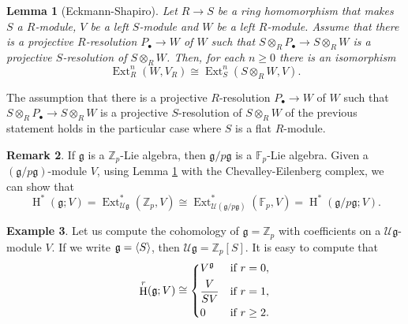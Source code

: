 \documentclass[11pt]{article}
\newcommand{\Fp}{\mathbb{F}_p}
\newcommand{\Zp}{\mathbb{Z}_p}
\newcommand{\g}{\mathfrak{g}}
\newcommand{\U}{\mathcal{U}}
\DeclareMathOperator{\HH}{H}
\DeclareMathOperator{\Ext}{Ext}
\newcommand{\isom}{\cong}
\DeclarePairedDelimiter{\gen}{\langle}{\rangle}
\theoremstyle{plain}
\newtheorem{lemma}{Lemma}[section]
\theoremstyle{definition}
\newtheorem{remark}[lemma]{Remark}
\newtheorem{example}[lemma]{Example}
\begin{document}
\begin{lemma}[Eckmann-Shapiro]\label{lem: eckmann-shapiro}
	Let $R\longrightarrow S$ be a ring homomorphism that makes $S$ a $R$-module, $V$ be a left  $S$-module and $W$ be a left $R$-module. Assume that there is a projective $R$-resolution $ P_{\bullet} \longrightarrow W$ of $W$ such that $S\otimes_RP_{\bullet}\longrightarrow S\otimes_R W$ is a projective $S$-resolution of $S\otimes_R W$. Then, for each $n\geq 0$ there is an isomorphism 
	\begin{displaymath}
		\Ext_R^n (W,V_R)\isom \Ext_S^n(S\otimes_R W, V).
	\end{displaymath}
\end{lemma}

The assumption that  there is a projective $R$-resolution $ P_{\bullet} \longrightarrow W$ of $W$ such that $S\otimes_RP_{\bullet}\longrightarrow S\otimes_R W$ is a projective $S$-resolution of $S\otimes_R W$ of the previous statement holds in the particular case where $S$ is a flat $R$-module. 


\begin{remark}
	If $\g$ is a $\Zp$-Lie algebra, then $\g/p\g$ is a $\Fp$-Lie algebra. Given a $(\g/p\g)$-module $V$, using Lemma \ref{lem: eckmann-shapiro} with the Chevalley-Eilenberg complex, we can show that 
	\begin{displaymath}
		\HH^{*}(\g;V)=\Ext_{\U\g}^{*}(\Zp,V)\isom\Ext_{\U(\g/p\g)}^{*}(\Fp,V)=\HH^{*}(\g/p\g;V).
	\end{displaymath}
\end{remark}

\begin{example}\label{ex: LieDimOne}
	Let us compute the cohomology of $\g=\Zp$ with coefficients on a $\U\g$-module $V$. If we write $\g=\gen{S}$, then $\U\g=\Zp[S]$. It is easy to compute that 
	\begin{displaymath}
		\HH^r(\g;V)\isom \begin{dcases}
			V^{\g} & \text{if } r=0, \\
			\frac{V}{SV} & \text{if } r=1, \\
			0 & \text{if } r\geq 2. \\
		\end{dcases}
	\end{displaymath}
\end{example}


	
	

	
	
	
	
\end{document}
